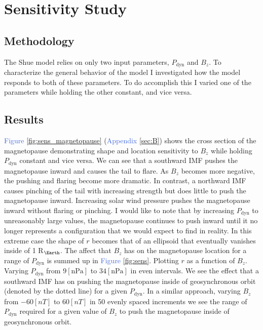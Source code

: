 \documentclass[12pt, letterpaper]{article}
\begin{document}
\section{Sensitivity Study}
\label{sec:sensitivity}
\subsection{Methodology}
The Shue model relies on only two input parameters, $P_{\text{dyn}}$ and $B_{z}$. To characterize the general behavior of the model I investigated how the model responds to both of these parameters. To do accomplish this I varied one of the parameters while holding the other constant, and vice versa. 

\subsection{Results}
\textcolor{RoyalBlue}{Figure \ref{fig:sens_magnetopause}} (\textcolor{RoyalBlue}{Appendix \ref{sec:B}}) shows the cross section of the magnetopause demonstrating shape and location sensitivity to $B_{z}$ while holding $P_{\text{dyn}}$ constant and vice versa. We can see that a southward IMF pushes the magnetopause inward and causes the tail to flare. As $B_{z}$ becomes more negative, the pushing and flaring become more dramatic. In contrast, a northward IMF causes pinching of the tail with increasing strength but does little to push the magnetopause inward. Increasing solar wind pressure pushes the magnetopause inward without flaring or pinching. I would like to note that by increasing $P_{\text{dyn}}$ to unreasonably large values, the magnetopause continues to push inward until it no longer represents a configuration that we would expect to find in reality. In this extreme case the shape of $r$ becomes that of an ellipsoid that eventually vanishes inside of 1 R$_{\Earth}$. The affect that $B_{z}$ has on the magnetopause location for a range of $P_{\text{dyn}}$ is summed up in \textcolor{RoyalBlue}{Figure \ref{fig:sens}}. Plotting $r$ as a function of $B_{z}$. Varying $P_{\text{dyn}}$ from $9 \left[ \text{nPa} \right]$ to $34 \left[ \text{nPa} \right]$ in even intervals. We see the effect that a southward IMF has on pushing the magnetopause inside of geosynchronous orbit (denoted by the dotted line) for a given $P_{\text{dyn}}$. In a similar approach, varying $B_{z}$ from $-60 \left[ nT \right]$ to $60 \left[ nT \right]$ in 50 evenly spaced increments we see the range of $P_{\text{dyn}}$ required for a given value of $B_{z}$ to push the magnetopause inside of geosynchronous orbit. 
\end{document}
